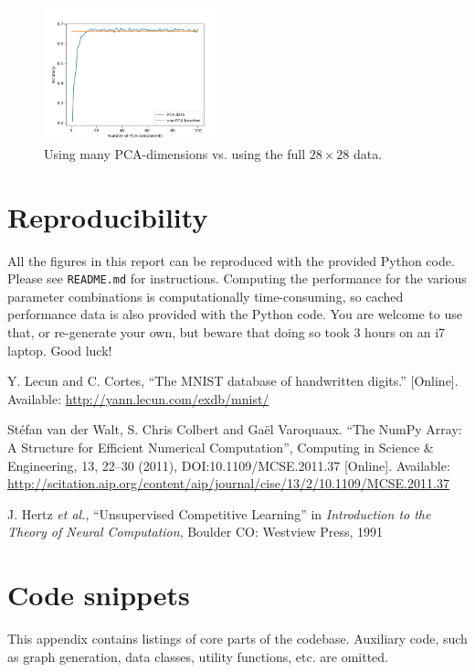 \documentclass[a4paper, 11pt, twocolumn, final]{article} %
\begin{document}
\begin{figure}
  \includegraphics[width=0.46\textwidth]{pca_comparison.png}
  \caption{Using many PCA-dimensions vs. using the full $28\times28$ data.}
  \label{fig:pca_comparison}
\end{figure}

\section{Reproducibility} All the figures in this report can be reproduced with
the provided Python code.  Please see \texttt{README.md} for instructions.
Computing the performance for the various parameter combinations is
computationally time-consuming, so cached performance data is also provided with
the Python code.  You are welcome to use that, or re-generate your own, but
beware that doing so took 3 hours on an i7 laptop.  Good luck!

\begin{thebibliography}{9}
  Y. Lecun and C. Cortes,
  ``The MNIST database of handwritten digits.''
  [Online].
  Available: \url{http://yann.lecun.com/exdb/mnist/}

  Stéfan van der Walt, S. Chris Colbert and Gaël Varoquaux.
  ``The NumPy Array: A Structure for Efficient Numerical Computation'',
  Computing in Science \& Engineering, 13, 22--30 (2011),
  DOI:10.1109/MCSE.2011.37
  [Online].
  Available: \url{http://scitation.aip.org/content/aip/journal/cise/13/2/10.1109/MCSE.2011.37}

  J. Hertz \textit{et al.},
  ``Unsupervised Competitive Learning''
  in \textit{Introduction to the Theory of Neural Computation},
  Boulder CO: Westview Press,
  1991

\end{thebibliography}

\onecolumn \appendix \section{Code snippets} \label{sec:code} This appendix
contains listings of core parts of the codebase.  Auxiliary code, such as graph
generation, data classes, utility functions, etc. are omitted.
\end{document}
